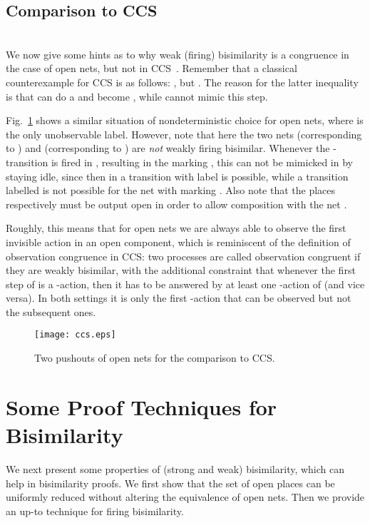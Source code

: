 \documentclass{LMCS}
\begin{document}
\subsection{Comparison to CCS}
\ \\

\noindent
We now give some hints as to why weak (firing) bisimilarity is a congruence in
the case of open nets, but not in CCS~\cite{Mil:CCS}.  Remember that a
classical counterexample for CCS is as follows: , but . The reason for the latter inequality is that  can do a
 and become , while  cannot mimic this step.

Fig.~\ref{fi:open-nets-ccs} shows a similar situation of
nondeterministic choice for open nets, where  is the only
unobservable label.  However, note that here the two nets 
(corresponding to ) and  (corresponding to ) are
\emph{not} weakly firing bisimilar. Whenever the -transition is
fired in , resulting in the marking , this can not be
mimicked in  by staying idle, since then in  a transition
with label  is possible, while a transition labelled
 is not possible for the net  with marking .  Also
note that the places  respectively  must be output open in
order to allow composition with the net .

Roughly, this means that for open nets we are always able to observe
the first invisible action in an open component, which is reminiscent
of the definition of observation congruence 
in CCS: two processes  are called observation congruent if they
are weakly bisimilar, with the additional constraint that whenever the
first step of  is a -action, then it has to be answered by at
least one -action of  (and vice versa). In both settings it
is only the first -action that can be observed but not the
subsequent ones.

\begin{figure}[t]
  \begin{center}
    \texttt{[image: ccs.eps]}
  \end{center}
  \caption{Two pushouts of open nets for the comparison to CCS.}

  \label{fi:open-nets-ccs}
\end{figure}


\section{Some Proof Techniques for Bisimilarity}
\label{sec:proof-techniques}


We next present some properties of (strong and weak) bisimilarity,
which can help in bisimilarity proofs. We first show that the set of
open places can be uniformly reduced without altering the equivalence
of open nets. Then we provide an up-to technique for firing
bisimilarity.
\end{document}
